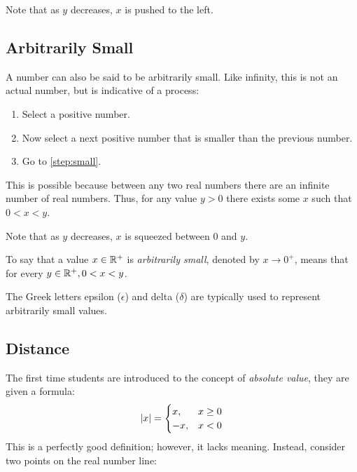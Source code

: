 \documentclass[letterpaper,12pt,fleqn]{article}
\renewcommand{\d}{\delta}
\newcommand{\e}{\epsilon}
\begin{document}
Note that as \(y\) decreases, \(x\) is pushed to the left.

\subsection*{Arbitrarily Small}

A number can also be said to be arbitrarily small.  Like infinity, this is not an actual number, but is indicative
of a process:

\begin{enumerate}
\item Select a positive number.
\item\label{step:small} Now select a next positive number that is smaller than the previous number.
\item Go to \ref{step:small}.
\end{enumerate}

This is possible because between any two real numbers there are an infinite number of real numbers.  Thus, for any
value \(y>0\) there exists some \(x\) such that \(0<x<y\).

\bigskip

\begin{center}
\end{center}

Note that as \(y\) decreases, \(x\) is squeezed between \(0\) and \(y\).

\begin{definition}
  To say that a value \(x\in\mathbb{R}^+\) is \emph{arbitrarily small}, denoted by \(x\to0^+\), means that for every
  \(y\in\mathbb{R}^+,0<x<y\).
\end{definition}

The Greek letters epsilon (\(\e\)) and delta (\(\d\)) are typically used to represent arbitrarily small values.

\subsection*{Distance}

The first time students are introduced to the concept of \emph{absolute value}, they are given a formula:
\[\lvert x\rvert=\begin{cases}
x, & x\ge0 \\
-x, & x<0
\end{cases}\]
This is a perfectly good definition; however, it lacks meaning.  Instead, consider two points on the real
number line:
\end{document}
